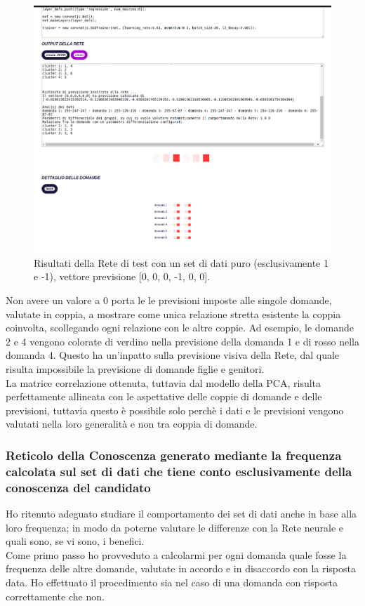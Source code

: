 \begin{figure}[H]
\centering
	\includegraphics[width=1\linewidth]{./image/RetediProva_generatorinputpuro.png}
	\caption{Risultati della Rete di test con un set di dati puro (esclusivamente 1 e -1), vettore previsione [0, 0, 0, -1, 0, 0].}
	\label{Risultati della Rete di test con un set di dati puro (esclusivamente 1 e -1), vettore previsione [0, 0, 0, -1, 0, 0].}
\end{figure}
\noindent
Non avere un valore a 0 porta le le previsioni imposte alle singole domande, valutate in coppia, a mostrare come unica relazione stretta esistente la coppia coinvolta, scollegando ogni relazione con le altre coppie. Ad esempio, le domande 2 e 4 vengono colorate di verdino nella previsione della domanda 1 e di rosso nella domanda 4. Questo ha un'inpatto sulla previsione visiva della Rete, dal quale risulta impossibile la previsione di domande figlie e genitori.\\
La matrice correlazione ottenuta, tuttavia dal modello della PCA, risulta perfettamente allineata con le aspettative delle coppie di domande e delle previsioni, tuttavia questo \`e possibile solo perch\`e i dati e le previsioni vengono valutati nella loro generalit\`a e non tra coppia di domande.


\subsubsection{Reticolo della Conoscenza generato mediante la frequenza calcolata sul set di dati che tiene conto esclusivamente della conoscenza del candidato}
\label{Reticolo della Conoscenza generato mediante la frequenza calcolata sul set di dati che tiene conto eclusivamente della conoscenza del candidato}
Ho ritenuto adeguato studiare il comportamento dei set di dati anche in base alla loro frequenza; in modo da poterne valutare le differenze con la Rete neurale e quali sono, se vi sono, i benefici.\\
Come primo passo ho provveduto a calcolarmi per ogni domanda quale fosse la frequenza delle altre domande, valutate in accordo e in disaccordo con la risposta data. Ho effettuato il procedimento sia nel caso di una domanda con risposta correttamente che non.


